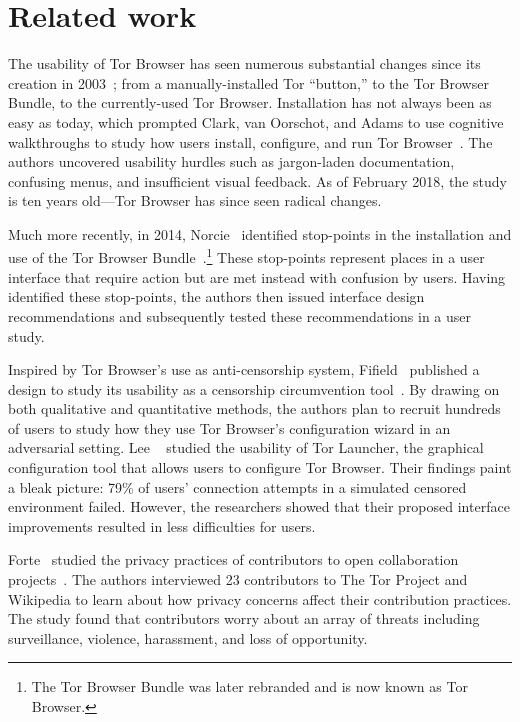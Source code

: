 \section{Related work}
\label{sec:related-work}

The usability of Tor Browser has seen numerous substantial changes since its
creation in 2003~\cite{Syverson2005a}; from a manually-installed Tor ``button,''
to the Tor Browser Bundle, to the currently-used Tor Browser.  Installation has
not always been as easy as today, which prompted Clark, van Oorschot, and Adams
to use cognitive walkthroughs to study how users install, configure, and run
Tor Browser~\cite{Clark2007a}.  The authors uncovered usability hurdles such as
jargon-laden documentation, confusing menus, and insufficient visual feedback.
As of February 2018, the study is ten years old---Tor Browser has since seen
radical changes.

Much more recently, in 2014, Norcie \ea\ identified stop-points in the
installation and use of the Tor Browser Bundle~\cite{Norcie2014a}.\footnote{The
Tor Browser Bundle was later rebranded and is now known as Tor Browser.}  These
stop-points represent places in a user interface that require action but are met
instead with confusion by users.  Having identified these stop-points, the
authors then issued interface design recommendations and subsequently tested
these recommendations in a user study.

Inspired by Tor Browser's use as anti-censorship system, Fifield \ea\ published
a design to study its usability as a censorship circumvention
tool~\cite{Fifield2015a}.  By drawing on both qualitative and quantitative
methods, the authors plan to recruit hundreds of users to study how they use Tor
Browser's configuration wizard in an adversarial setting.  Lee
\ea~\cite{Lee2017a} studied the usability of Tor Launcher, the graphical
configuration tool that allows users to configure Tor Browser.  Their findings
paint a bleak picture: 79\% of users' connection attempts in a simulated
censored environment failed.  However, the researchers showed that their
proposed interface improvements resulted in less difficulties for users.

Forte \ea\ studied the privacy practices of contributors to open collaboration
projects~\cite{Forte2017a}.  The authors interviewed 23 contributors to The Tor
Project and Wikipedia to learn about how privacy concerns affect their
contribution practices.  The study found that contributors worry about an array
of threats including surveillance, violence, harassment, and loss of
opportunity.

